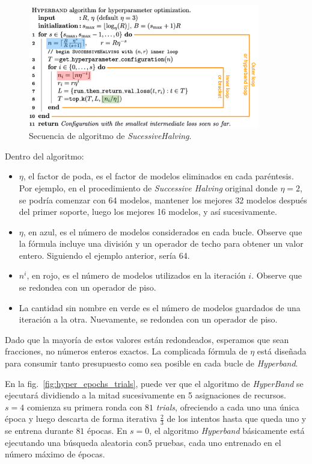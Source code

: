 \documentclass[a4paper,12pt]{article}
\begin{document}
\begin{figure}[H]
	\begin{center}
	\includegraphics[width=0.9\textwidth]{hyperband_algo.png}
  	\caption{Secuencia de algoritmo de \textit{SucessiveHalving}.}
  	\label{fig:hyper_algo}
  	\end{center}
\end{figure}

Dentro del algoritmo:
\begin{itemize}
	\item $\eta$, el factor de poda, es el factor de modelos eliminados en cada paréntesis. Por ejemplo, en el procedimiento de \textit{Successive Halving} original donde $\eta = 2$, se podría comenzar con 64 modelos, mantener los mejores 32 modelos después del primer soporte, luego los mejores 16 modelos, y así sucesivamente.
	\item $\eta$, en azul, es el número de modelos considerados en cada bucle. Observe que la fórmula incluye una división y un operador de techo para obtener un valor entero. Siguiendo el ejemplo anterior, sería 64.
	\item $n^i$, en rojo, es el número de modelos utilizados en la iteración $i$. Observe que se redondea con un operador de piso.
	\item La cantidad sin nombre en verde es el número de modelos guardados de una iteración a la otra. Nuevamente, se redondea con un operador de piso.
\end{itemize}

Dado que la mayoría de estos valores están redondeados, esperamos que sean fracciones, no números enteros exactos. La complicada fórmula de $\eta$ está diseñada para consumir tanto presupuesto como sea posible en cada bucle de \textit{Hyperband}.

En la fig.~\ref{fig:hyper_epochs_trials}, puede ver que el algoritmo de \textit{HyperBand} se ejecutará dividiendo a la mitad sucesivamente en 5 asignaciones de recursos. $s=4$ comienza su primera ronda con $81$ \textit{trials}, ofreciendo a cada uno una única época y luego descarta de forma iterativa $\frac{2}{3}$ de los intentos hasta que queda uno y se entrena durante $81$ épocas. En $s=0$, el algoritmo \textit{Hyperband} básicamente está ejecutando una búsqueda aleatoria con$ 5$ pruebas, cada uno entrenado en el número máximo de épocas.
\end{document}
